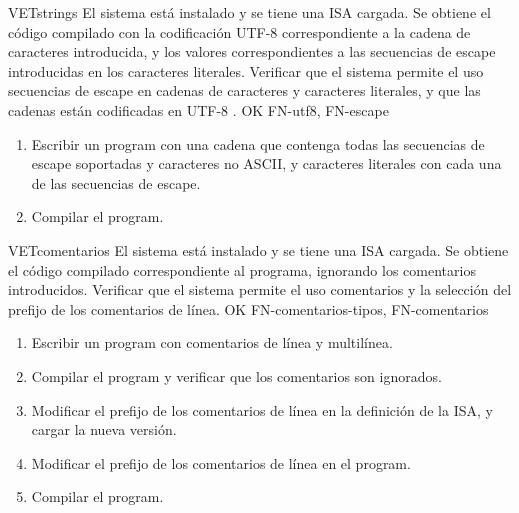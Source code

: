 \begin{testCase}{VET}{strings}
    {El sistema está instalado y se tiene una \gls{ISA} cargada.} %
    {Se obtiene el código compilado con la codificación UTF-8 \parencite{UTF-8}
    correspondiente a la cadena de caracteres introducida, y los valores
    correspondientes a las secuencias de escape introducidas en los caracteres
    literales.} %
    {Verificar que el sistema permite el uso secuencias de escape en cadenas de
    caracteres y caracteres literales, y que las cadenas están codificadas en
    UTF-8 \parencite{UTF-8}.} %
    {OK} %
    {FN-utf8, FN-escape} %
    \begin{enumerate}[leftmargin=*, topsep=0pt, noitemsep] %
        \item Escribir un \gls{program} con una cadena que contenga todas las
        secuencias de escape soportadas y caracteres no ASCII, y caracteres
        literales con cada una de las secuencias de escape.
        \item Compilar el \gls{program}.
    \end{enumerate}
\end{testCase}

\begin{testCase}{VET}{comentarios}
    {El sistema está instalado y se tiene una \gls{ISA} cargada.} %
    {Se obtiene el código compilado correspondiente al programa, ignorando los
    comentarios introducidos.} %
    {Verificar que el sistema permite el uso comentarios y la selección del
    prefijo de los comentarios de línea.} %
    {OK} %
    {FN-comentarios-tipos, FN-comentarios} %
    \begin{enumerate}[leftmargin=*, topsep=0pt, noitemsep] %
        \item Escribir un \gls{program} con comentarios de línea y multilínea.
        \item Compilar el \gls{program} y verificar que los comentarios son
        ignorados.
        \item Modificar el prefijo de los comentarios de línea en la definición
        de la \gls{ISA}, y cargar la nueva versión.
        \item Modificar el prefijo de los comentarios de línea en el
        \gls{program}.
        \item Compilar el \gls{program}.
    \end{enumerate}
\end{testCase}

